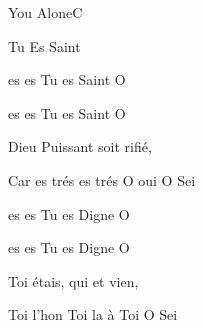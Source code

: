 \documentclass[12pt]{book}
\begin{document}
\begin{song}{You Alone}{C}
\begin{xlatn}{Tu Es Saint}
    \begin{SBVerse}
       es   es  Tu es Saint O 

       es   es  Tu es Saint O 

      Dieu Puissant soit rifi\'e,

      Car  es tr\'es   es tr\'es  O oui  O Sei
    \end{SBVerse}

    \begin{SBVerse}
       es   es  Tu es Digne O 

       es   es  Tu es Digne O 

      Toi  \'etais, qui  et vien,

       Toi l'hon  Toi la  \`a Toi  O Sei
    \end{SBVerse}
  \end{xlatn}
\end{song}
\end{document}
